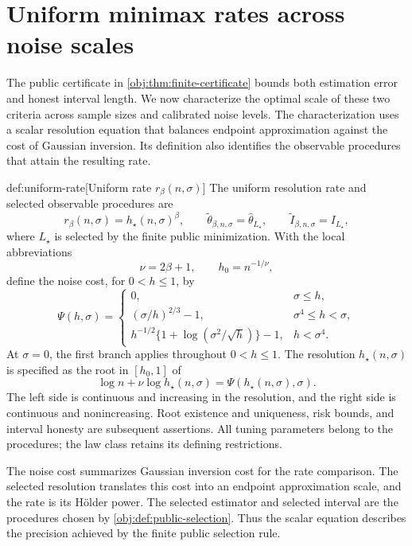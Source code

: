\section{Uniform minimax rates across noise scales}

The public certificate in \cref{obj:thm:finite-certificate} bounds both estimation error and honest interval length. We now characterize the optimal scale of these two criteria across sample sizes and calibrated noise levels. The characterization uses a scalar resolution equation that balances endpoint approximation against the cost of Gaussian inversion. Its definition also identifies the observable procedures that attain the resulting rate.

\begin{definitionv}{def:uniform-rate}[Uniform rate \(r_\beta(n,\sigma)\)]
The uniform resolution rate and selected observable procedures are
\[
r_\beta(n,\sigma)=h_\star(n,\sigma)^\beta,
\qquad
\widetilde\theta_{\beta,n,\sigma}=\widehat\theta_{L_\star},
\qquad
\widetilde I_{\beta,n,\sigma}=I_{L_\star},
\]
where \(L_\star\) is selected by the finite public minimization. With the local abbreviations
\[
\nu=2\beta+1,\qquad h_0=n^{-1/\nu},
\]
define the noise cost, for \(0<h\le1\), by
\[
\Psi(h,\sigma)=
\begin{cases}
0,&\sigma\le h,\\
(\sigma/h)^{2/3}-1,&\sigma^4\le h<\sigma,\\
h^{-1/2}\{1+\log(\sigma^2/\sqrt h)\}-1,&h<\sigma^4.
\end{cases}
\]
At \(\sigma=0\), the first branch applies throughout \(0<h\le1\). The resolution \(h_\star(n,\sigma)\) is specified as the root in \([h_0,1]\) of
\[
\log n+\nu\log h_\star(n,\sigma)
=\Psi(h_\star(n,\sigma),\sigma).
\]
The left side is continuous and increasing in the resolution, and the right side is continuous and nonincreasing. Root existence and uniqueness, risk bounds, and interval honesty are subsequent assertions. All tuning parameters belong to the procedures; the law class retains its defining restrictions.
\end{definitionv}

The noise cost  summarizes Gaussian inversion cost for the rate comparison. The selected resolution  translates this cost into an endpoint approximation scale, and the rate  is its Hölder power. The selected estimator  and selected interval  are the procedures chosen by \cref{obj:def:public-selection}. Thus the scalar equation describes the precision achieved by the finite public selection rule.

